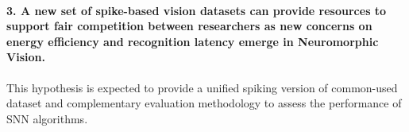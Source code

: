 \paragraph{3. A new set of spike-based vision datasets can provide resources to support fair competition between researchers as new concerns on energy efficiency and recognition latency emerge in Neuromorphic Vision.}
This hypothesis is expected to provide a unified spiking version of common-used dataset and complementary evaluation methodology to assess the performance of SNN algorithms.

%
%
%
